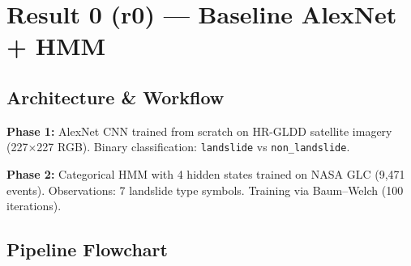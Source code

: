 \documentclass[12pt,a4paper]{article}
\begin{document}
\section{Result 0 (r0) --- Baseline AlexNet + HMM}

\subsection{Architecture \& Workflow}

\textbf{Phase 1:} AlexNet CNN trained from scratch on HR-GLDD satellite imagery (227$\times$227 RGB).
Binary classification: \texttt{landslide} vs \texttt{non\_landslide}.

\textbf{Phase 2:} Categorical HMM with 4 hidden states trained on NASA GLC (9,471 events).
Observations: 7 landslide type symbols. Training via Baum--Welch (100 iterations).

\subsection{Pipeline Flowchart}
\end{document}
